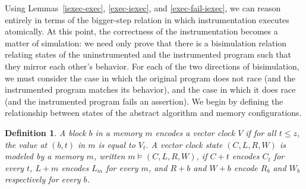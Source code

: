 \documentclass[preprint, 10pt]{sigplanconf}
\newtheorem{definition}{Definition}
\begin{document}
Using Lemmas~\ref{iexec-exec}, \ref{exec-iexec}, and \ref{exec-fail-iexec}, we can reason entirely in terms of the bigger-step relation in which instrumentation executes atomically. At this point, the correctness of the instrumentation becomes a matter of simulation: we need only prove that there is a bisimulation relation relating states of the uninstrumented and the instrumented program such that they mirror each other's behavior. For each of the two directions of bisimulation, we must consider the case in which the original program does not race (and the instrumented program matches its behavior), and the case in which it does race (and the instrumented program fails an assertion). We begin by defining the relationship between states of the abstract algorithm and memory configurations.
\begin{definition}A block $b$ in a memory $m$ encodes a vector clock $V$ if for all $t \le z$, the value at $(b, t)$ in $m$ is equal to $V_t$. A vector clock state $(C, L, R, W)$ is modeled by a memory $m$, written $m \models (C, L, R, W)$, if $C + t$ encodes $C_t$ for every $t$, $L + m$ encodes $L_m$ for every $m$, and $R + b$ and $W + b$ encode $R_b$ and $W_b$ respectively for every $b$.\end{definition}
\end{document}
